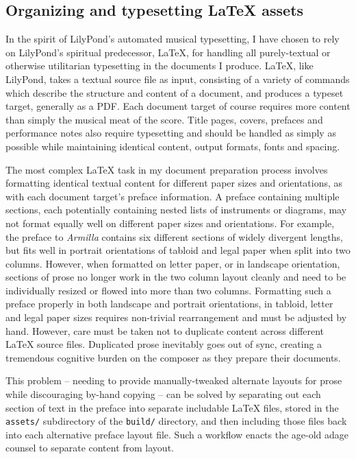 \subsection{Organizing and typesetting LaTeX assets}
\label{ssec:organizing-and-typesetting-latex-assets}

In the spirit of LilyPond's automated musical typesetting, I have chosen to
rely on LilyPond's spiritual predecessor, LaTeX, for handling all
purely-textual or otherwise utilitarian typesetting in the documents I produce.
LaTeX, like LilyPond, takes a textual source file as input, consisting of a
variety of commands which describe the structure and content of a document, and
produces a typeset target, generally as a PDF. Each document target of course
requires more content than simply the musical meat of the score. Title pages,
covers, prefaces and performance notes also require typesetting and should be
handled as simply as possible while maintaining identical content, output
formats, fonts and spacing.

The most complex LaTeX task in my document preparation process involves
formatting identical textual content for different paper sizes and
orientations, as with each document target's preface information. A preface
containing multiple sections, each potentially containing nested lists of
instruments or diagrams, may not format equally well on different paper sizes
and orientations. For example, the preface to \emph{Armilla} contains six
different sections of widely divergent lengths, but fits well in portrait
orientations of tabloid and legal paper when split into two columns. However,
when formatted on letter paper, or in landscape orientation, sections of prose
no longer work in the two column layout cleanly and need to be individually
resized or flowed into more than two columns. Formatting such a preface
properly in both landscape and portrait orientations, in tabloid, letter and
legal paper sizes requires non-trivial rearrangement and must be adjusted by
hand. However, care must be taken not to duplicate content across different
LaTeX source files. Duplicated prose inevitably goes out of sync, creating a
tremendous cognitive burden on the composer as they prepare their documents.

This problem -- needing to provide manually-tweaked alternate layouts for prose
while discouraging by-hand copying -- can be solved by separating out each
section of text in the preface into separate includable LaTeX files, stored in
the \texttt{assets/} subdirectory of the \texttt{build/} directory, and then
including those files back into each alternative preface layout file. Such a
workflow enacts the age-old adage counsel to separate content from layout.

